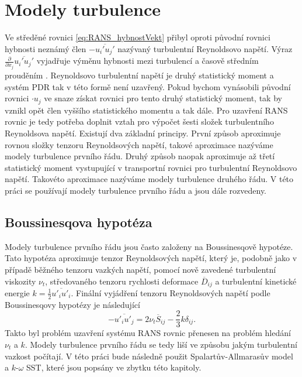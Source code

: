\section{Modely turbulence}
Ve středěné rovnici \ref{eq:RANS_hybnostVekt} přibyl oproti původní rovnici hybnosti neznámý člen $-\overline{u_i' u_j'}$ nazývaný turbulentní Reynoldsovo napětí. Výraz $ \frac{\partial}{\partial x_j}\overline{u_i' u_j'} $ vyjadřuje výměnu hybnosti mezi turbulencí a časově středním prouděním \cite{dvorak1987vnitrniaerodynamika}. Reynoldsovo turbulentní napětí je druhý statistický moment a systém PDR tak v této formě není uzavřený. Pokud bychom vynásobili původní rovnici $ \cdot u_j $ ve snaze získat rovnici pro tento druhý statistický moment, tak by vznikl opět člen vyššího statistického momentu a tak dále. Pro uzavření RANS rovnic je tedy potřeba doplnit vztah pro výpočet šesti složek turbulentního Reynoldsova napětí. Existují dva základní principy. První způsob aproximuje rovnou složky tenzoru Reynoldsových napětí, takové aproximace nazýváme modely turbulence prvního řádu. Druhý způsob naopak aproximuje až třetí statistický moment vystupující v transportní rovnici pro turbulentní Reynoldsovo napětí. Takovéto aproximace nazýváme modely turbulence druhého řádu. V této práci se používají modely turbulence prvního řádu a jsou dále rozvedeny.

\subsection{Boussinesqova hypotéza}
Modely turbulence prvního řádu jsou často založeny na Boussinesqově hypotéze. Tato hypotéza aproximuje tenzor Reynoldsových napětí, který je, podobně jako v případě běžného tenzoru vazkých napětí, pomocí nově zavedené turbulentní viskozity $\nu_t$, středovaného tenzoru rychlosti deformace $\overline{D}_{ij}$ a turbulentní kinetické energie $k= \frac{1}{2}\overline{u'_i u'_i}$. Finální vyjádření tenzoru Reynoldsových napětí podle Boussinesqovy hypotézy je následující
\begin{equation}\label{eq:boussinesq}
-\overline{u'_i u'_j} = 2\nu_t \overline{S}_{ij} -\frac{2}{3}k\delta_{ij}.
\end{equation}
Takto byl problém uzavření systému RANS rovnic přenesen na problém hledání $ \nu_t $ a $ k $. Modely turbulence prvního řádu se tedy liší ve způsobu jakým turbulentní vazkost počítají. V této práci bude následně použit Spalartův-Allmarasův model a $k\text{-}\omega$ SST, které jsou popsány ve zbytku této kapitoly.

